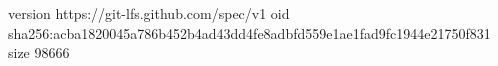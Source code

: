 version https://git-lfs.github.com/spec/v1
oid sha256:acba1820045a786b452b4ad43dd4fe8adbfd559e1ae1fad9fc1944e21750f831
size 98666
